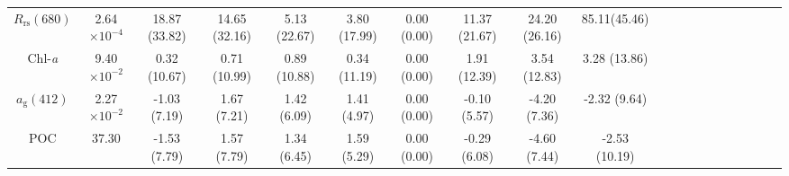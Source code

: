 \documentclass[preview]{standalone}
\begin{document}
\begin{threeparttable}
\begin{tabular}{@{\extracolsep{4pt}}Sc ccccccccc ccccccccc@{}}
$R_\text{rs}(680)$ 	& 2.64$\times10^{-4}$	& 18.87 (33.82)& 14.65 (32.16)& 5.13 (22.67)& 3.80 (17.99)& 0.00 (0.00) & 11.37 (21.67)& 24.20 (26.16)& 85.11(45.46) 	\\
Chl-\it{a}    	& 9.40$\times10^{-2}$ 	&  0.32 (10.67)& 0.71 (10.99)& 0.89 (10.88)& 0.34 (11.19)& 0.00 (0.00) & 1.91 (12.39)& 3.54 (12.83)& 3.28 (13.86) 		\\ 
$a_\text{g}(412)$  	& 2.27$\times10^{-2}$ & -1.03 (7.19)& 1.67 (7.21)& 1.42 (6.09)& 1.41 (4.97)& 0.00 (0.00)& -0.10 (5.57)& -4.20 (7.36)& -2.32 (9.64) 	\\ 
POC	       	&  37.30 &  -1.53 (7.79) & 1.57 (7.79) & 1.34 (6.45) & 1.59 (5.29) & 0.00 (0.00) & -0.29 (6.08) & -4.60 (7.44) & -2.53 (10.19)					\\ %


\end{tabular}
\end{threeparttable}
\end{document}
